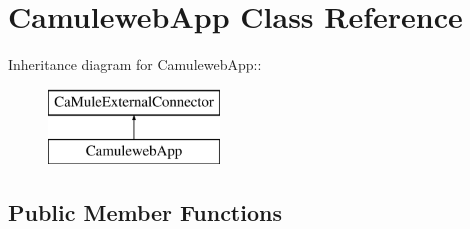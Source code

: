 \section{CamulewebApp Class Reference}
\label{classCamulewebApp}
Inheritance diagram for CamulewebApp::\begin{figure}[H]
\begin{center}
\leavevmode
\includegraphics[height=2cm]{classCamulewebApp}
\end{center}
\end{figure}
\subsection*{Public Member Functions}
